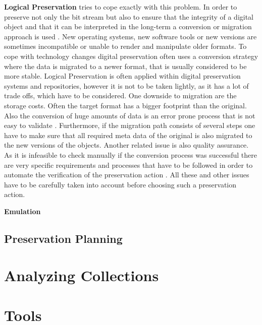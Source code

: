 \textbf{Logical Preservation} tries to cope exactly with this problem. In order to preserve not only the bit stream but also to ensure that the integrity of a digital object and that it can be interpreted in the long-term a conversion or migration approach is used \cite{Lee:2002:SOTADP}. New operating systems, new software tools or new versions are sometimes incompatible or unable to render and manipulate older formats. To cope with technology changes digital preservation often uses a conversion strategy where the data is migrated to a newer format, that is usually considered to be more stable.
Logical Preservation is often applied within digital preservation systems and repositories, however it is not to be taken lightly, as it has a lot of trade offs, which have to be considered.
One downside to migration are the storage costs. Often the target format has a bigger footprint than the original. Also the conversion of huge amounts of data is an error prone process that is not easy to validate \cite{Lorie:2001:LTP:379437.379726}. Furthermore, if the migration path consists of several steps one have to make sure that all required meta data of the original is also migrated to the new versions of the objects. Another related issue is also quality assurance. As it is infeasible to check manually if the conversion process was successful there are very specific requirements and processes that have to be followed in order to automate the verification of the preservation action \cite{feng:2010:qrofm}.
All these and other issues have to be carefully taken into account before choosing such a preservation action.
\newline

\textbf{Emulation}

\subsection{Preservation Planning}
\section{Analyzing Collections}

\section{Tools}

